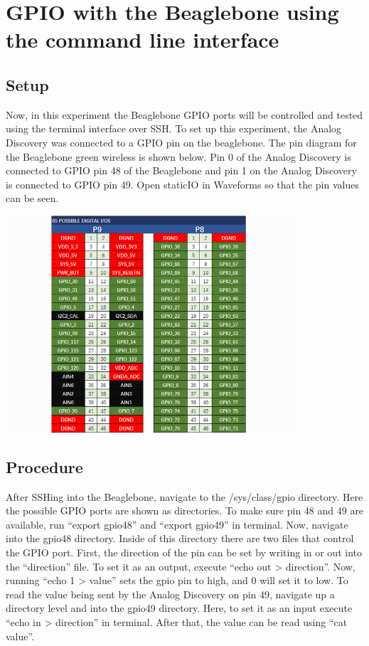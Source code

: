 \documentclass{article}
\begin{document}
\section{GPIO with the Beaglebone using the command line interface}
\subsection{Setup}
Now, in this experiment the Beaglebone GPIO ports will be controlled and tested using the terminal interface over SSH. To set up this experiment, the Analog Discovery was connected to a GPIO pin on the beaglebone. The pin diagram for the Beaglebone green wireless is shown below. Pin 0 of the Analog Discovery is connected to GPIO pin 48 of the Beaglebone and pin 1 on the Analog Discovery is connected to GPIO pin 49. Open staticIO in Waveforms so that the pin values can be seen.
\begin{center}
	\includegraphics[width=0.8\textwidth]{img/Lab1_4.PNG}
\end{center}
\subsection{Procedure}
After SSHing into the Beaglebone, navigate to the /sys/class/gpio directory. Here the possible GPIO ports are shown as directories. To make sure pin 48 and 49 are available, run “export gpio48” and “export gpio49” in terminal. Now, navigate into the gpio48 directory. Inside of this directory there are two files that control the GPIO port. First, the direction of the pin can be set by writing in or out into the “direction” file. To set it as an output, execute “echo out > direction”. Now, running “echo 1 > value” sets the gpio pin to high, and 0 will set it to low. To read the value being sent by the Analog Discovery on pin 49, navigate up a directory level and into the gpio49 directory. Here, to set it as an input execute “echo in > direction” in terminal. After that, the value can be read using “cat value”.
\end{document}
